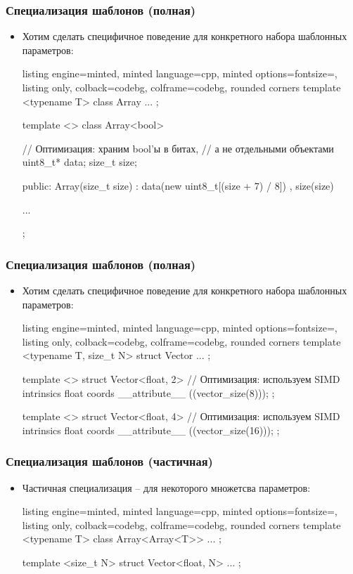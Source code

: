 \documentclass[10pt]{beamer}
\begin{document}
\begin{frame}[fragile]
\frametitle{Специализация шаблонов (полная)}
\begin{itemize}
\item Хотим сделать специфичное поведение для конкретного набора шаблонных параметров:
\begin{tcblisting}{listing engine=minted, minted language=cpp, minted options={fontsize=\scriptsize}, listing only, colback=codebg, colframe=codebg, rounded corners}
template <typename T>
class Array { ... };

template <>
class Array<bool> {
  // Оптимизация: храним bool'ы в битах,
  // а не отдельными объектами
  uint8_t* data;
  size_t size;

public:
  Array(size_t size)
    : data(new uint8_t[(size + 7) / 8])
    , size(size)
  {}

  ...
};
\end{tcblisting}
\end{itemize}
\end{frame}

\begin{frame}[fragile]
\frametitle{Специализация шаблонов (полная)}
\begin{itemize}
\item Хотим сделать специфичное поведение для конкретного набора шаблонных параметров:
\begin{tcblisting}{listing engine=minted, minted language=cpp, minted options={fontsize=\scriptsize}, listing only, colback=codebg, colframe=codebg, rounded corners}
template <typename T, size_t N>
struct Vector { ... };

template <>
struct Vector<float, 2> {
  // Оптимизация: используем SIMD intrinsics
  float coords __attribute__ ((vector_size(8)));
};

template <>
struct Vector<float, 4> {
  // Оптимизация: используем SIMD intrinsics
  float coords __attribute__ ((vector_size(16)));
};
\end{tcblisting}
\end{itemize}
\end{frame}

\begin{frame}[fragile]
\frametitle{Специализация шаблонов (частичная)}
\begin{itemize}
\item Частичная специализация -- для некоторого множетсва параметров:
\begin{tcblisting}{listing engine=minted, minted language=cpp, minted options={fontsize=\scriptsize}, listing only, colback=codebg, colframe=codebg, rounded corners}
template <typename T>
class Array<Array<T>> { ... };

template <size_t N>
struct Vector<float, N> { ... };
\end{tcblisting}
\end{itemize}
\end{frame}
\end{document}
